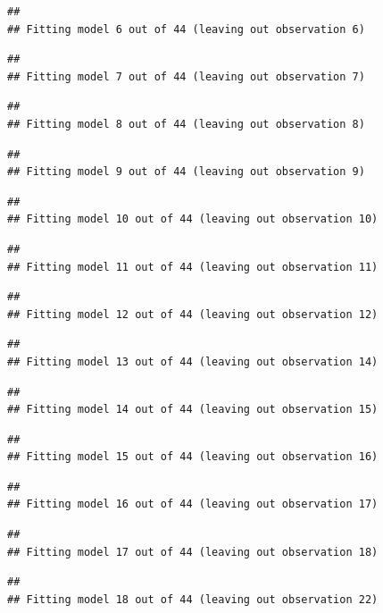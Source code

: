 \documentclass[]{article}
\begin{document}
\begin{verbatim}
## 
## Fitting model 6 out of 44 (leaving out observation 6)
\end{verbatim}

\begin{verbatim}
## 
## Fitting model 7 out of 44 (leaving out observation 7)
\end{verbatim}

\begin{verbatim}
## 
## Fitting model 8 out of 44 (leaving out observation 8)
\end{verbatim}

\begin{verbatim}
## 
## Fitting model 9 out of 44 (leaving out observation 9)
\end{verbatim}

\begin{verbatim}
## 
## Fitting model 10 out of 44 (leaving out observation 10)
\end{verbatim}

\begin{verbatim}
## 
## Fitting model 11 out of 44 (leaving out observation 11)
\end{verbatim}

\begin{verbatim}
## 
## Fitting model 12 out of 44 (leaving out observation 12)
\end{verbatim}

\begin{verbatim}
## 
## Fitting model 13 out of 44 (leaving out observation 14)
\end{verbatim}

\begin{verbatim}
## 
## Fitting model 14 out of 44 (leaving out observation 15)
\end{verbatim}

\begin{verbatim}
## 
## Fitting model 15 out of 44 (leaving out observation 16)
\end{verbatim}

\begin{verbatim}
## 
## Fitting model 16 out of 44 (leaving out observation 17)
\end{verbatim}

\begin{verbatim}
## 
## Fitting model 17 out of 44 (leaving out observation 18)
\end{verbatim}

\begin{verbatim}
## 
## Fitting model 18 out of 44 (leaving out observation 22)
\end{verbatim}
\end{document}
